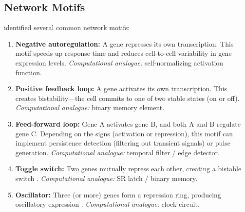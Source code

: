 \subsection{Network Motifs}

\citet{alon2019} identified several common network motifs:

\begin{enumerate}[leftmargin=1.8em]
  \item \textbf{Negative autoregulation:} A gene represses its own transcription. This motif speeds up response time and reduces cell-to-cell variability in gene expression levels. \emph{Computational analogue:} self-normalizing activation function.

  \item \textbf{Positive feedback loop:} A gene activates its own transcription. This creates bistability---the cell commits to one of two stable states (on or off). \emph{Computational analogue:} binary memory element.

  \item \textbf{Feed-forward loop:} Gene A activates gene B, and both A and B regulate gene C. Depending on the signs (activation or repression), this motif can implement persistence detection (filtering out transient signals) or pulse generation. \emph{Computational analogue:} temporal filter / edge detector.

  \item \textbf{Toggle switch:} Two genes mutually repress each other, creating a bistable switch \citep{gardner2000}. \emph{Computational analogue:} SR latch / binary memory.

  \item \textbf{Oscillator:} Three (or more) genes form a repression ring, producing oscillatory expression \citep{elowitz2000}. \emph{Computational analogue:} clock circuit.
\end{enumerate}

